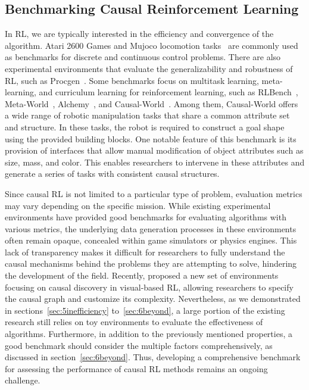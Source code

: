 \documentclass[10pt]{article} %
\theoremstyle{definition}
\begin{document}
\subsection{Benchmarking Causal Reinforcement Learning}
\label{subsec:7.5benchmarks}

In RL, we are typically interested in the efficiency and convergence of the algorithm. Atari 2600 Games and Mujoco locomotion tasks~\citep{brockmanOpenAIGym2016} are commonly used as benchmarks for discrete and continuous control problems. There are also experimental environments that evaluate the generalizability and robustness of RL, such as Procgen~\citep{cobbeLeveragingProceduralGeneration2020}. Some benchmarks focus on multitask learning, meta-learning, and curriculum learning for reinforcement learning, such as RLBench~\citep{jamesRLBenchRobotLearning2019}, Meta-World~\citep{yuMetaWorldBenchmarkEvaluation2021}, Alchemy~\citep{wangAlchemyBenchmarkAnalysis2021}, and Causal-World~\cite{ahmedCausalWorldRoboticManipulation2022}. 
Among them, Causal-World offers a wide range of robotic manipulation tasks that share a common attribute set and structure. In these tasks, the robot is required to construct a goal shape using the provided building blocks. One notable feature of this benchmark is its provision of interfaces that allow manual modification of object attributes such as size, mass, and color. This enables researchers to intervene in these attributes and generate a series of tasks with consistent causal structures.

Since causal RL is not limited to a particular type of problem, evaluation metrics may vary depending on the specific mission. While existing experimental environments have provided good benchmarks for evaluating algorithms with various metrics, the underlying data generation processes in these environments often remain opaque, concealed within game simulators or physics engines. This lack of transparency makes it difficult for researchers to fully understand the causal mechanisms behind the problems they are attempting to solve, hindering the development of the field. 
Recently, \citet{keSystematicEvaluationCausal} proposed a new set of environments focusing on causal discovery in visual-based RL, allowing researchers to specify the causal graph and customize its complexity. Nevertheless, as we demonstrated in sections~\ref{sec:5inefficiency} to~\ref{sec:6beyond}, a large portion of the existing research still relies on toy environments to evaluate the effectiveness of algorithms. 
Furthermore, in addition to the previously mentioned properties, a good benchmark should consider the multiple factors comprehensively, as discussed in section~\ref{sec:6beyond}. Thus, developing a comprehensive benchmark for assessing the performance of causal RL methods remains an ongoing challenge.
\end{document}
